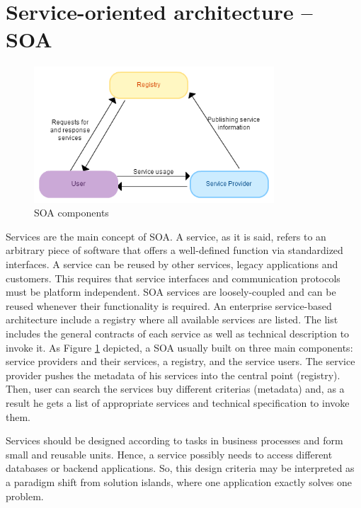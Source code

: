 \section{Service-oriented architecture -- SOA}

\begin{figure}
    \centering
    \includegraphics[width=0.8\textwidth]{resources/SOA.png}
    \caption{SOA components}
    \label{fig:soa}
\end{figure}

Services are the main concept of SOA. A service, as it is said, refers to an arbitrary piece of software that offers a well-defined function via standardized interfaces. A service can be reused by other services, legacy applications and customers. This requires that service interfaces and communication protocols must be platform independent. SOA services are loosely-coupled and can be reused whenever their functionality is required. An enterprise service-based architecture include a registry where all available services are listed. The list includes the general contracts of each service as well as technical description to invoke it. As Figure \ref{fig:soa} depicted, a SOA usually built on three main components: service providers and their services, a registry, and the service users. The service provider pushes the metadata of his services into the central point (registry). Then, user can search the services buy different criterias (metadata) and, as a result he gets a list of appropriate services and technical specification to invoke them.

Services should be designed according to tasks in business processes and form small and reusable units. Hence, a service possibly needs to access different databases or backend applications. So, this design criteria may be interpreted as a paradigm shift from solution islands, where one application exactly solves one problem.

